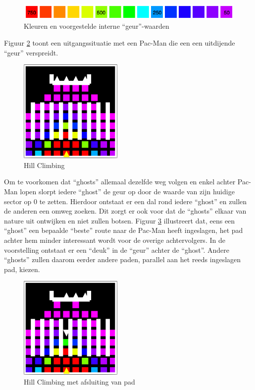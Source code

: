 \documentclass[12pt,a4paper]{report}
\begin{document}
\begin{figure}[htbp]
  \centering
  \includegraphics[width=150mm]{resources/colormap.png}
  \caption{Kleuren en voorgestelde interne ``geur''-waarden}
  \label{fig:colormap}
\end{figure}

Figuur \ref{fig:hillclimbing1} toont een uitgangssituatie met een Pac-Man die een een uitdijende ``geur'' verspreidt.

\begin{figure}[htbp]
  \centering
  \includegraphics[width=50mm]{resources/hillclimbing1.png}
  \caption{Hill Climbing}
  \label{fig:hillclimbing1}
\end{figure}

Om te voorkomen dat ``ghosts'' allemaal dezelfde weg volgen en enkel achter Pac-Man lopen slorpt iedere ``ghost'' de geur op door de waarde van zijn huidige sector op 0 te zetten. Hierdoor ontstaat er een dal rond iedere ``ghost'' en zullen de anderen een omweg zoeken. Dit zorgt er ook voor dat de ``ghosts'' elkaar van nature uit ontwijken en niet zullen botsen. Figuur \ref{fig:hillclimbing2} illustreert dat, eens een ``ghost'' een bepaalde ``beste'' route naar de Pac-Man heeft ingeslagen, het pad achter hem minder interessant wordt voor de overige achtervolgers. In de voorstelling ontstaat er een ``deuk'' in de ``geur'' achter de ``ghost''. Andere ``ghosts'' zullen daarom eerder andere paden, parallel aan het reeds ingeslagen pad, kiezen.

\begin{figure}[htbp]
  \centering
  \includegraphics[width=50mm]{resources/hillclimbing2.png}
  \caption{Hill Climbing met afsluiting van pad}
  \label{fig:hillclimbing2}
\end{figure}
\end{document}

